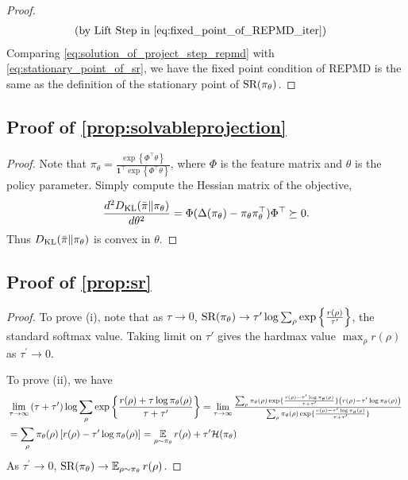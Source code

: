 \begin{proof}
\begin{equation}
\begin{split}
		\text{(by Lift Step in \cref{eq:fixed_point_of_REPMD_iter})} &
	\end{split}
	\end{equation}
	Comparing \cref{eq:solution_of_project_step_repmd} with \cref{eq:stationary_point_of_sr}, we have the fixed point condition of REPMD is the same as the definition of the stationary point of $\text{SR}(\pi_{\theta})$.
\end{proof}

\subsection{Proof of \cref{prop:solvableprojection}}
\begin{proof}
	Note that $\pi_{\theta} = \frac{\exp\left\{\Phi^\top\theta\right\}}{{\mathbf{1}^\top \exp\left\{\Phi^\top\theta\right\} }}$, where $\Phi$ is the feature matrix and $\theta$ is the policy parameter.
	Simply compute the Hessian matrix of the objective,
	 \[\frac{d^2 D_{\mathrm{KL}}(\bar{\pi} \| \pi_{\theta})}{d \theta^2} = \Phi (\Delta(\pi_\theta) - \pi_\theta \pi_\theta^\top) \Phi^\top \succeq 0.
	 \]
	 Thus $D_{\mathrm{KL}}(\bar{\pi} \| \pi_{\theta})$ is convex in $\theta$.
\end{proof}

\subsection{Proof of \cref{prop:sr}}
\begin{proof}
	To prove (i), note that as $\tau \to 0$, $\text{SR}(\pi_\theta) \to \tau^{\prime} \log{ \sum_{\rho}{ \exp\left\{ \frac{r(\rho) }{ \tau^{\prime} } \right\} }}$, the standard softmax value. Taking limit on $\tau'$ gives the hardmax value $\max_{\rho}{r(\rho)}$ as $\tau^{\prime} \to 0$.
	
	To prove (ii), we have 
	\begin{align*}
	&\lim\limits_{\tau \to \infty}{ (\tau + \tau^{\prime})\log{ \sum_{\rho}{ \exp\left\{ \frac{r(\rho) + \tau \log{\pi_\theta(\rho)} }{\tau + \tau^{\prime}} \right\} }} } = {\scalebox{.95} {$\lim\limits_{\tau \to \infty}{ \frac{ \sum_{\rho}{ \pi_\theta(\rho) \exp\{ \frac{r(\rho) - \tau^{\prime} \log{\pi_\theta(\rho)} }{\tau + \tau^{\prime}} \} \left( r(\rho) - \tau^{\prime}\log{\pi_\theta(\rho)} \right) } }{  \sum_{\rho}{ \pi_\theta(\rho) \exp\{ \frac{r(\rho) - \tau^{\prime} \log{\pi_\theta(\rho)} }{\tau + \tau^{\prime}} \} } } }$ } }\\
	&= \sum_{\rho}{ \pi_\theta(\rho) \left[ r(\rho) - \tau^{\prime}\log{\pi_\theta(\rho)} \right] } = \ep_{\rho \sim \pi_\theta}{r(\rho)} + \tau^{\prime} \mathcal{H}(\pi_\theta)
	\end{align*}
	As $\tau^{\prime} \to 0$, $\text{SR}(\pi_\theta) \to \operatorname*{\mathbb{E}}_{\rho \sim \pi_\theta}{r(\rho)}$.
\end{proof}

